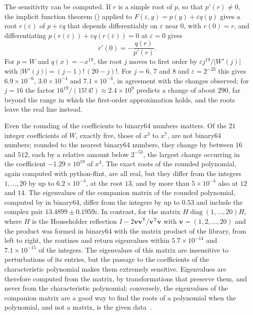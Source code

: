 The sensitivity can be computed. If $r$ is a simple root of $p$, so that $p'(r)\ne0$, the implicit function theorem () applied to $F(\varepsilon,y)=p(y)+\varepsilon q(y)$ gives a root $r(\varepsilon)$ of $p+\varepsilon q$ that depends differentiably on $\varepsilon$ near $0$, with $r(0)=r$, and differentiating $p(r(\varepsilon))+\varepsilon q(r(\varepsilon))=0$ at $\varepsilon=0$ gives
\[
r'(0)=-\frac{q(r)}{p'(r)} .
\]
For $p=W$ and $q(x)=-x^{19}$, the root $j$ moves to first order by $\varepsilon j^{19}/|W'(j)|$ with $|W'(j)|=(j-1)!\,(20-j)!$. For $j=6$, $7$ and $8$ and $\varepsilon=2^{-23}$ this gives $6.9\times10^{-6}$, $3.0\times10^{-4}$ and $7.1\times10^{-3}$, in agreement with the changes observed; for $j=16$ the factor $16^{19}/(15!\,4!)\approx2.4\times10^9$ predicts a change of about $290$, far beyond the range in which the first-order approximation holds, and the roots leave the real line instead.

Even the rounding of the coefficients to binary64 numbers matters. Of the $21$ integer coefficients of $W$, exactly five, those of $x^3$ to $x^7$, are not binary64 numbers; rounded to the nearest binary64 numbers, they change by between $16$ and $512$, each by a relative amount below $2^{-53}$, the largest change occurring in the coefficient $-1.29\times10^{19}$ of $x^3$. The exact roots of the rounded polynomial, again computed with python-flint, are all real, but they differ from the integers $1,\ldots,20$ by up to $6.2\times10^{-4}$, at the root $13$, and by more than $5\times10^{-4}$ also at $12$ and $14$. The eigenvalues of the companion matrix of the rounded polynomial, computed by  in binary64, differ from the integers by up to $0.53$ and include the complex pair $13.4899\pm0.1959i$. In contrast, for the matrix $H\operatorname{diag}(1,\ldots,20)H$, where $H$ is the Householder reflection $I-2\mathbf v\mathbf v^{\mathsf T}/\mathbf v^{\mathsf T}\mathbf v$ with $\mathbf v=(1,2,\ldots,20)$ and the product was formed in binary64 with the matrix product of the library, from left to right, the routines  and  return eigenvalues within $5.7\times10^{-14}$ and $7.1\times10^{-15}$ of the integers. The eigenvalues of this matrix are insensitive to perturbations of its entries, but the passage to the coefficients of the characteristic polynomial makes them extremely sensitive. Eigenvalues are therefore computed from the matrix, by transformations that preserve them, and never from the characteristic polynomial; conversely, the eigenvalues of the companion matrix are a good way to find the roots of a polynomial when the polynomial, and not a matrix, is the given data~\cite{edelman1995}.


